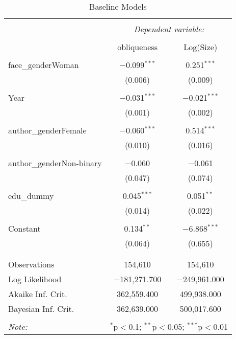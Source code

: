 
\begin{table}[!htbp] \centering 
  \caption{Baseline Models} 
  \label{} 
\begin{tabular}{@{\extracolsep{5pt}}lcc} 
\\[-1.8ex]\hline 
\hline \\[-1.8ex] 
 & \multicolumn{2}{c}{\textit{Dependent variable:}} \\ 
\cline{2-3} 
\\[-1.8ex] & obliqueness & Log(Size) \\ 
\hline \\[-1.8ex] 
 face\_genderWoman & $-$0.099$^{***}$ & 0.251$^{***}$ \\ 
  & (0.006) & (0.009) \\ 
  & & \\ 
 Year & $-$0.031$^{***}$ & $-$0.021$^{***}$ \\ 
  & (0.001) & (0.002) \\ 
  & & \\ 
 author\_genderFemale & $-$0.060$^{***}$ & 0.514$^{***}$ \\ 
  & (0.010) & (0.016) \\ 
  & & \\ 
 author\_genderNon-binary & $-$0.060 & $-$0.061 \\ 
  & (0.047) & (0.074) \\ 
  & & \\ 
 edu\_dummy & 0.045$^{***}$ & 0.051$^{**}$ \\ 
  & (0.014) & (0.022) \\ 
  & & \\ 
 Constant & 0.134$^{**}$ & $-$6.868$^{***}$ \\ 
  & (0.064) & (0.655) \\ 
  & & \\ 
\hline \\[-1.8ex] 
Observations & 154,610 & 154,610 \\ 
Log Likelihood & $-$181,271.700 & $-$249,961.000 \\ 
Akaike Inf. Crit. & 362,559.400 & 499,938.000 \\ 
Bayesian Inf. Crit. & 362,639.000 & 500,017.600 \\ 
\hline 
\hline \\[-1.8ex] 
\textit{Note:}  & \multicolumn{2}{r}{$^{*}$p$<$0.1; $^{**}$p$<$0.05; $^{***}$p$<$0.01} \\ 
\end{tabular} 
\end{table} 
